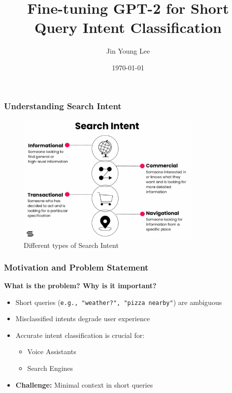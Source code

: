 \documentclass{beamer}
\title{Fine-tuning GPT-2 for Short Query Intent Classification}
\author{Jin Young Lee}
\date{\today}
\begin{document}
\begin{frame}
\titlepage
\end{frame}

\begin{frame}
\frametitle{Understanding Search Intent}
\centering
\begin{figure}
    \includegraphics[width=0.8\textwidth]{assets/search_intent.png}
    \caption{Different types of Search Intent}
\end{figure}
\end{frame}

\begin{frame}
  \frametitle{Motivation and Problem Statement}
  \textbf{What is the problem? Why is it important?}
  \begin{itemize}
    \item Short queries (\texttt{e.g., "weather?", "pizza nearby"}) are ambiguous
    \item Misclassified intents degrade user experience
    \item Accurate intent classification is crucial for:
    \begin{itemize}
      \item Voice Assistants
      \item Search Engines
    \end{itemize}
    \item \textbf{Challenge:} Minimal context in short queries
  \end{itemize}
\end{frame}
\end{document}
